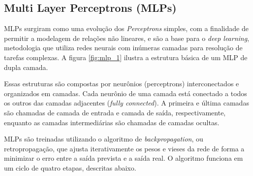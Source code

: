\subsection{Multi Layer Perceptrons (MLPs)}
MLPs surgiram como uma evolução dos \textit{Perceptrons} simples, com a finalidade de permitir a modelagem de relações
não lineares, e são a base para o \textit{deep learning}, metodologia que utiliza redes neurais com inúmeras camadas para
resolução de tarefas complexas. A figura \ref{fig:mlp_1} ilustra a estrutura básica de um MLP de dupla camada.

\begin{figure}[!ht]
	{}
	{}
\end{figure}

Essas estruturas são compostas por neurônios (perceptrons) interconectados e organizados em camadas. Cada neurônio de uma 
camada está conectado a todos os outros das camadas adjacentes (\textit{fully connected}). A primeira e última camadas são 
chamadas de camada de entrada e camada de saída, respectivamente, enquanto as camadas intermediárias são chamadas de 
camadas ocultas.

MLPs são treinadas utilizando o algoritmo de \textit{backpropagation}, ou retropropagação, que ajusta iterativamente os 
pesos e vieses da rede de forma a minimizar o erro entre a saída prevista e a saída real. O algoritmo funciona em um ciclo 
de quatro etapas, descritas abaixo.

